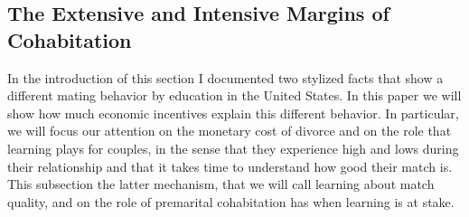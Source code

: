 \documentclass[12pt]{article}
\begin{document}
\subsection{The Extensive and Intensive Margins of Cohabitation}
In the introduction of this section I documented two stylized facts that show a different mating behavior by education in the United States. In this paper we will show how much economic incentives explain this different behavior. In particular, we will focus our attention on the monetary cost of divorce and on the role that learning plays for couples, in the sense that they experience high and lows during their relationship and that it takes time to understand how good their match is. This subsection the latter mechanism, that we will call learning about match quality, and on the role of premarital cohabitation has when learning is at stake.
\end{document}
